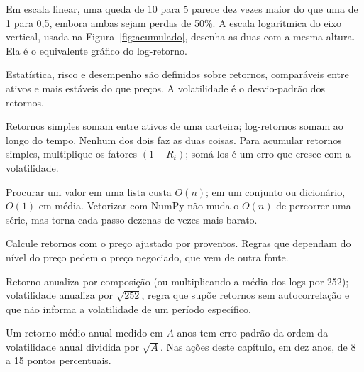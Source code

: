 
\begin{intuicao}
Em escala linear, uma queda de 10 para 5 parece dez vezes maior do que uma de 1 para 0,5, embora ambas sejam perdas de 50\%. A escala logarítmica do eixo vertical, usada na Figura~\ref{fig:acumulado}, desenha as duas com a mesma altura. Ela é o equivalente gráfico do log-retorno.
\end{intuicao}

\begin{resumo}
  \item Estatística, risco e desempenho são definidos sobre retornos, comparáveis entre ativos e mais estáveis do que preços. A volatilidade é o desvio-padrão dos retornos.
  \item Retornos simples somam entre ativos de uma carteira; log-retornos somam ao longo do tempo. Nenhum dos dois faz as duas coisas. Para acumular retornos simples, multiplique os fatores $(1+R_t)$; somá-los é um erro que cresce com a volatilidade.
  \item Procurar um valor em uma lista custa $O(n)$; em um conjunto ou dicionário, $O(1)$ em média. Vetorizar com NumPy não muda o $O(n)$ de percorrer uma série, mas torna cada passo dezenas de vezes mais barato.
  \item Calcule retornos com o preço ajustado por proventos. Regras que dependam do nível do preço pedem o preço negociado, que vem de outra fonte.
  \item Retorno anualiza por composição (ou multiplicando a média dos logs por 252); volatilidade anualiza por $\sqrt{252}$, regra que supõe retornos sem autocorrelação e que não informa a volatilidade de um período específico.
  \item Um retorno médio anual medido em $A$ anos tem erro-padrão da ordem da volatilidade anual dividida por $\sqrt{A}$. Nas ações deste capítulo, em dez anos, de 8 a 15 pontos percentuais.
\end{resumo}

